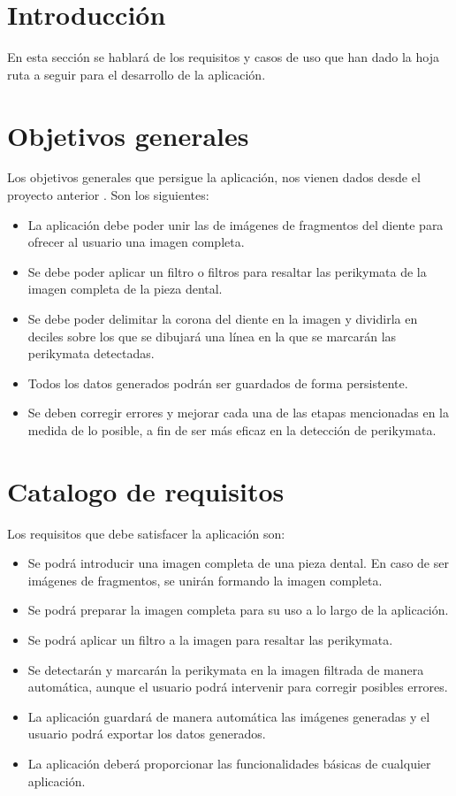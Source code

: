 
\section{Introducción}
En esta sección se hablará de los requisitos y casos de uso que han dado la hoja ruta a seguir para el desarrollo de la aplicación.
\section{Objetivos generales}
Los objetivos generales que persigue la aplicación, nos vienen dados desde el proyecto anterior \cite{perikymataV1}. Son los siguientes:
\begin{itemize}
    \item La aplicación debe poder unir las de imágenes de fragmentos del diente para ofrecer al usuario una imagen completa.
    \item Se debe poder aplicar un filtro o filtros para resaltar las perikymata de la imagen completa de la pieza dental. 
    \item Se debe poder delimitar la corona del diente en la imagen y dividirla en deciles sobre los que se dibujará una línea en la que se marcarán las perikymata detectadas.
    \item Todos los datos generados podrán ser guardados de forma persistente.
    \item Se deben corregir errores y mejorar cada una de las etapas mencionadas en la medida de lo posible, a fin de ser más eficaz en la detección de perikymata.
\end{itemize}

\pagebreak
\section{Catalogo de requisitos}
Los requisitos que debe satisfacer la aplicación son:
\begin{itemize}
        \item Se podrá introducir una imagen completa de una pieza dental. En caso de ser imágenes de fragmentos, se unirán formando la imagen completa.
        \item Se podrá preparar la imagen completa para su uso a lo largo de la aplicación.
        \item Se podrá aplicar un filtro a la imagen para resaltar las perikymata.
        \item Se detectarán y marcarán la perikymata en la imagen filtrada de manera automática, aunque el usuario podrá intervenir para corregir posibles errores.
        \item La aplicación guardará de manera automática las imágenes generadas y el usuario podrá exportar los datos generados.
        \item La aplicación deberá proporcionar las funcionalidades básicas de cualquier aplicación.
\end{itemize}

